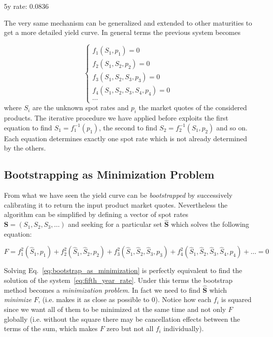 
\begin{ioutput}
5y rate: 0.0836
\end{ioutput}

The very same mechanism can be generalized and extended to other maturities to get a more detailed yield curve. In general terms the previous system becomes

\begin{equation}
\begin{cases}
f_1(S_1, p_1) = 0 \\
f_2(S_1, S_2, p_2) = 0 \\
f_3(S_1, S_2, S_3, p_3) = 0 \\
f_4(S_1, S_2, S_3, S_4, p_4) = 0 \\
\cdots
\end{cases}
\end{equation}
where $S_i$ are the unknown spot rates and $p_i$ the market quotes of the considered products. The iterative procedure we have applied before exploits the first equation to find $S_1 = f_1^{-1}(p_1)$, the second to find $S_2 = f_2^{-1}(S_1, p_2)$ and so on. Each equation determines exactly one spot rate which is not already determined by the others.

\subsection{Bootstrapping as Minimization Problem}
\label{sec:bootstrap_as_minimization}

From what we have seen the yield curve can be \emph{bootstrapped} by successively calibrating it to return the input product market quotes.
Nevertheless the algorithm can be simplified by defining a vector of spot rates $\mathbf{S} = (S_1, S_2, S_3, \ldots)$ and seeking for a particular set $\mathbf{\hat{S}}$ which solves the following equation:

\begin{equation}
F = f_1^2(\hat{S}_1,p_1) + f_2^2(\hat{S}_1, \hat{S}_2,p_2) + f_3^2(\hat{S}_1, \hat{S}_2, \hat{S}_3,p_3) + f_4^2(\hat{S}_1, \hat{S}_2, \hat{S}_3, \hat{S}_4,p_4) + \ldots = 0
\label{eq:bootstrap_as_minimization}
\end{equation}

Solving Eq.~\ref{eq:bootstrap_as_minimization} is perfectly equivalent to find the solution of the system~\ref{eq:fifth_year_rate}.
Under this terms the bootstrap method becomes a \emph{minimization problem}. In fact we need to find $\mathbf{\hat{S}}$ which \emph{minimize} $F$, (i.e. makes it as close as possible to 0).
Notice how each $f_i$ is squared since we want all of them to be minimized at the same time and not only $F$ globally (i.e. without the square there may be cancellation effects between the terms of the sum, which makes $F$ zero but not all $f_i$ individually).

